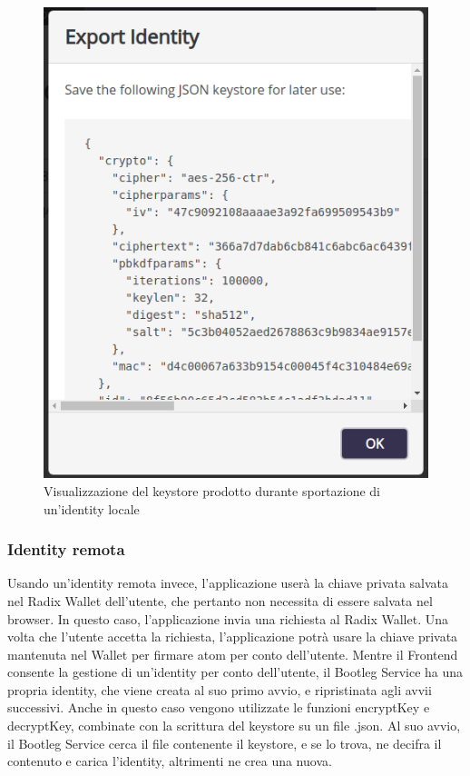 \begin{figure}[H]
  \centering
  \includegraphics[scale=0.4]{images/application/save-keystore.png}
  \caption{Visualizzazione del keystore prodotto durante sportazione di un'identity locale}
  \label{fig:save_keystore}
\end{figure}

\subsubsection{Identity remota}

Usando un'identity remota invece, l'applicazione userà la chiave privata salvata nel Radix Wallet dell'utente, che pertanto non necessita di essere salvata nel browser. In questo caso, l'applicazione invia una richiesta al Radix Wallet. Una volta che l'utente accetta la richiesta, l'applicazione potrà usare la chiave privata mantenuta nel Wallet per firmare atom per conto dell'utente.
Mentre il Frontend consente la gestione di un'identity per conto dell'utente, il Bootleg Service ha una propria identity, che viene creata al suo primo avvio, e ripristinata agli avvii successivi. Anche in questo caso vengono utilizzate le funzioni encryptKey e decryptKey, combinate con la scrittura del keystore su un file .json. Al suo avvio, il Bootleg Service cerca il file contenente il keystore, e se lo trova, ne decifra il contenuto e carica l'identity, altrimenti ne crea una nuova.

